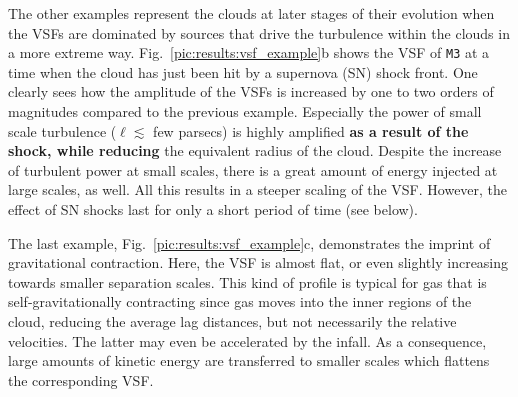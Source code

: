 The other examples represent the clouds at later stages of their evolution when the VSFs are dominated by sources that drive the turbulence within the clouds in a more extreme way.
Fig.~\ref{pic:results:vsf_example}b shows the VSF of \texttt{M3} at a time when the cloud has just been hit by a supernova (SN) shock front. 
One clearly sees how the amplitude of the VSFs is increased by one to two orders of magnitudes compared to the previous example.
Especially the power of small scale turbulence ($\ell \lesssim$ few parsecs) is highly amplified \textbf{as a result of the shock, while reducing} the equivalent radius of the cloud.
Despite the increase of turbulent power at small scales, there is a great amount of energy injected at large scales, as well.
All this results in a steeper scaling of the VSF.
However, the effect of SN shocks last for only a short period of time (see below).

The last example, Fig.~\ref{pic:results:vsf_example}c, demonstrates the imprint of gravitational contraction.
Here, the VSF is almost flat, or even slightly increasing towards smaller separation scales. 
This kind of profile is typical for gas that is self-gravitationally contracting \citep{Boneberg2015,Burkhart2015} since gas moves into the inner regions of the cloud, reducing the average lag distances, but not necessarily the relative velocities.
The latter may even be accelerated by the infall.
As a consequence, large amounts of kinetic energy are transferred to smaller scales which flattens the corresponding VSF.


\endinput
